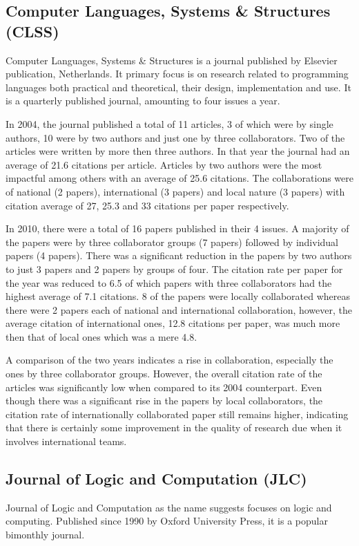 \documentclass[12pt]{article}
\begin{document}
\subsection{Computer Languages, Systems \& Structures (CLSS)}
Computer Languages, Systems \& Structures is a journal published by Elsevier publication, Netherlands. It primary focus is on research related to programming languages both practical and theoretical, their design, implementation and use. It is a quarterly published journal, amounting to four issues a year. 

In 2004, the journal published a total of 11 articles, 3 of which were by single authors, 10 were by two authors and just one by three collaborators. Two of the articles were written by more then three authors. In that year the journal had an average of 21.6 citations per article. Articles by two authors were the most impactful among others with an average of 25.6 citations. The collaborations were of national (2 papers), international (3 papers) and local nature (3 papers) with citation average of 27, 25.3 and 33 citations per paper respectively.

In 2010, there were a total of 16 papers published in their 4 issues. A majority of the papers were by three collaborator groups (7 papers) followed by individual papers (4 papers). There was a significant reduction in the papers by two authors to just 3 papers and 2 papers by groups of four. The citation rate per paper for the year was reduced to 6.5 of which papers with three collaborators had the highest average of 7.1 citations. 8 of the papers were locally collaborated whereas there were 2 papers each of national and international collaboration, however, the average citation of international ones, 12.8 citations per paper, was much more then that of local ones which was a mere 4.8.

A comparison of the two years indicates a rise in collaboration, especially the ones by three collaborator groups. However, the overall citation rate of the articles was significantly low when compared to its 2004 counterpart. Even though there was a significant rise in the papers by local collaborators, the citation rate of internationally collaborated paper still remains higher, indicating that there is certainly some improvement in the quality of research due when it involves international teams.

\subsection{Journal of Logic and Computation (JLC)}
Journal of Logic and Computation as the name suggests focuses on logic and computing. Published since 1990 by Oxford University Press, it is a popular bimonthly journal. 
\end{document}
